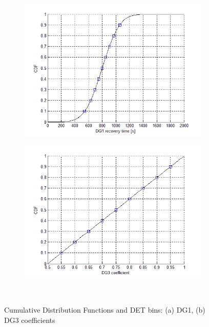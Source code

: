 \begin{figure}
        \centering %
        ~ %
        \begin{subfigure}[b]{0.48\textwidth}
                \centering
                \includegraphics[width=\textwidth]{figures/DG1Dist.png}
                \caption{}
                \label{fig:DG1Dist}
        \end{subfigure}
        \begin{subfigure}[b]{0.48\textwidth}
                \centering
                \includegraphics[width=\textwidth]{figures/DG3CoeffDist.png}
                \caption{}
                \label{fig:DG3CoeffDist}
        \end{subfigure}
        ~ %
        \caption{Cumulative Distribution Functions and DET bins: (a) DG1, (b) DG3 coefficients}\label{fig:CDFsDGs}
\end{figure}

